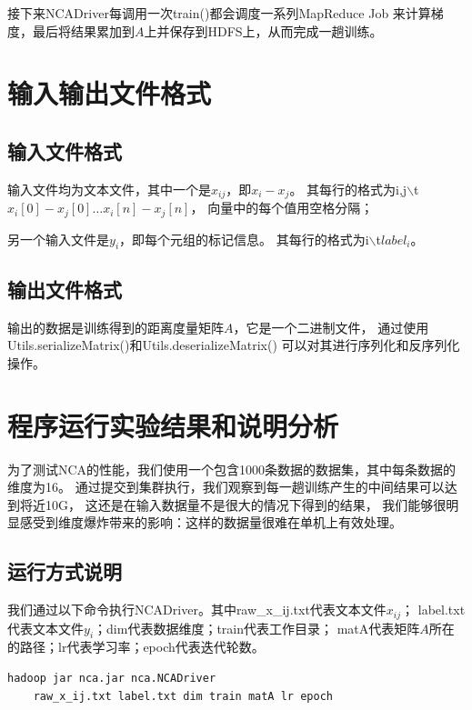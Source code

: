 \documentclass[a4paper,UTF8]{article}
\theoremstyle{definition}
\begin{document}
接下来NCADriver每调用一次train()都会调度一系列MapReduce Job
来计算梯度，最后将结果累加到$A$上并保存到HDFS上，从而完成一趟训练。

\section*{输入输出文件格式}

\subsection*{输入文件格式}

输入文件均为文本文件，其中一个是$x_{ij}$，即$x_i - x_j$。
其每行的格式为i,j$\backslash$t$x_i[0]-x_j[0] \dots x_i[n]-x_j[n]$，
向量中的每个值用空格分隔；

另一个输入文件是$y_i$，即每个元组的标记信息。
其每行的格式为i$\backslash$t$label_i$。

\subsection*{输出文件格式}

输出的数据是训练得到的距离度量矩阵$A$，它是一个二进制文件，
通过使用Utils.serializeMatrix()和Utils.deserializeMatrix()
可以对其进行序列化和反序列化操作。

\section*{程序运行实验结果和说明分析}

为了测试NCA的性能，我们使用一个包含1000条数据的数据集，其中每条数据的维度为16。
通过提交到集群执行，我们观察到每一趟训练产生的中间结果可以达到将近10G，
这还是在输入数据量不是很大的情况下得到的结果，
我们能够很明显感受到维度爆炸带来的影响：这样的数据量很难在单机上有效处理。

\subsection*{运行方式说明}

我们通过以下命令执行NCADriver。其中raw\_x\_ij.txt代表文本文件$x_{ij}$；
label.txt代表文本文件$y_i$；dim代表数据维度；train代表工作目录；
matA代表矩阵$A$所在的路径；lr代表学习率；epoch代表迭代轮数。

\begin{lstlisting}
hadoop jar nca.jar nca.NCADriver
	raw_x_ij.txt label.txt dim train matA lr epoch
\end{lstlisting}
\end{document}
